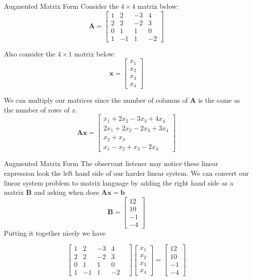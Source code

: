 \documentclass{beamer}
\begin{document}
\begin{frame}{Augmented Matrix Form}
Consider the \(4 \times 4\) matrix below:
\[
\mathbf{A} =
\begin{bmatrix}
    1 & 2 & -3 & 4 \\
    2 & 2 & -2 & 3 \\
    0 & 1 & 1 & 0 \\
    1 & -1 & 1 & -2
\end{bmatrix}
\]

Also consider the \(4 \times 1\) matrix below:
\[
\mathbf{x} =
\begin{bmatrix}
    x_1 \\
    x_2 \\
    x_3 \\
    x_4
\end{bmatrix}
\]

We can multiply our matrices since the number of columns of $\mathbf{A}$ is the same as the number of rows of $x$.
\[
\mathbf{Ax} =
\begin{bmatrix}
    x_1 + 2x_2 - 3x_3 + 4x_4 \\
    2x_1 + 2x_2 - 2x_3 + 3x_4 \\
    x_2 + x_3 \\
    x_1 - x_2 + x_3 - 2x_4
\end{bmatrix}
\]
\end{frame}

\begin{frame}{Augmented Matrix Form}
The observant listener may notice these linear expression look the left hand side of our harder linear system. We can convert our linear system problem to matrix language by adding the right hand side as a matrix $\mathbf{B}$ and asking when does $\mathbf{Ax} = \mathbf{b}$
\[
\mathbf{B} =
\begin{bmatrix}
    12 \\
    10 \\
    -1 \\
    -4
\end{bmatrix}
\]
Putting it together nicely we have

\[
\begin{bmatrix}
    1 & 2 & -3 & 4 & \\
    2 & 2 & -2 & 3 & \\
    0 & 1 & 1 & 0 & \\
    1 & -1 & 1 & -2 & 
\end{bmatrix}
\begin{bmatrix}
    x_1 \\
    x_2 \\
    x_3 \\
    x_4
\end{bmatrix}
=
\begin{bmatrix}
    12 \\
    10 \\
    -1 \\
    -4
\end{bmatrix}
\]  
\end{frame}
\end{document}
